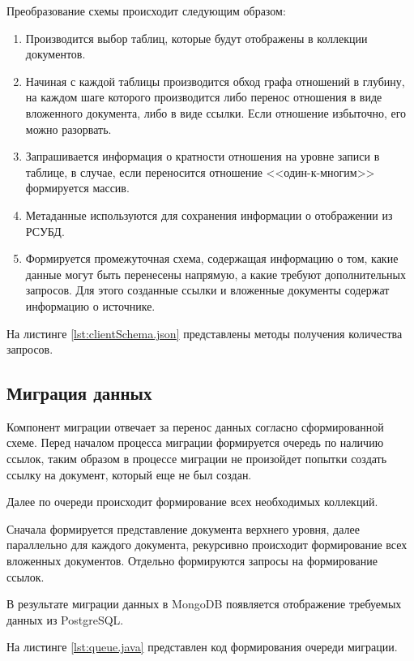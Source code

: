 Преобразование схемы происходит следующим образом:
\begin{enumerate}
    \item Производится выбор таблиц, которые будут отображены в коллекции документов.
    \item Начиная с каждой таблицы производится обход графа отношений в глубину,
    на каждом шаге которого производится либо перенос отношения в виде вложенного документа,
    либо в виде ссылки. Если отношение избыточно, его можно разорвать.
    \item Запрашивается информация о кратности отношения на уровне записи в таблице,
    в случае, если переносится отношение <<один-к-многим>> формируется массив.
    \item Метаданные используются для сохранения информации о отображении из РСУБД.
    \item Формируется промежуточная схема, содержащая информацию о том, 
    какие данные могут быть перенесены напрямую, а какие требуют дополнительных запросов.
    Для этого созданные ссылки и вложенные документы содержат информацию о источнике.
\end{enumerate}

\clearpage

На листинге \ref{lst:clientSchema.json} представлены методы получения количества запросов.

\clearpage

\subsection{Миграция данных}
Компонент миграции отвечает за перенос данных согласно сформированной схеме.
Перед началом процесса миграции формируется очередь по наличию ссылок, 
таким образом в процессе миграции не произойдет попытки создать ссылку на документ, 
который еще не был создан.

Далее по очереди происходит формирование всех необходимых коллекций.

Сначала формируется представление документа верхнего уровня, далее параллельно для каждого документа, 
рекурсивно происходит формирование всех вложенных документов. 
Отдельно формируются запросы на формирование ссылок.

В результате миграции данных в MongoDB появляется отображение требуемых данных из PostgreSQL.

На листинге \ref{lst:queue.java} представлен код формирования очереди миграции.

